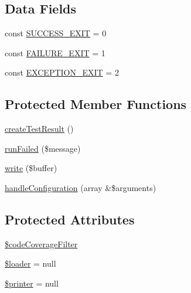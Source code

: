 \subsection*{Data Fields}
\begin{DoxyCompactItemize}
\item 
const \mbox{\hyperlink{class_p_h_p_unit___text_u_i___test_runner_a0be479aca54ac1c979f4d6ca78a8f354}{S\+U\+C\+C\+E\+S\+S\+\_\+\+E\+X\+IT}} = 0
\item 
const \mbox{\hyperlink{class_p_h_p_unit___text_u_i___test_runner_a3fd31acacaf8046bb92d7726869d0489}{F\+A\+I\+L\+U\+R\+E\+\_\+\+E\+X\+IT}} = 1
\item 
const \mbox{\hyperlink{class_p_h_p_unit___text_u_i___test_runner_a3441c77fb1d5dc5831a2277b5aa7d2b2}{E\+X\+C\+E\+P\+T\+I\+O\+N\+\_\+\+E\+X\+IT}} = 2
\end{DoxyCompactItemize}
\subsection*{Protected Member Functions}
\begin{DoxyCompactItemize}
\item 
\mbox{\hyperlink{class_p_h_p_unit___text_u_i___test_runner_a55202b5955819fc3c464a5801d1f7405}{create\+Test\+Result}} ()
\item 
\mbox{\hyperlink{class_p_h_p_unit___text_u_i___test_runner_a51ed3bece021dbcaad0aa7a8c911de39}{run\+Failed}} (\$message)
\item 
\mbox{\hyperlink{class_p_h_p_unit___text_u_i___test_runner_ab3c1b3a323cbbf707c55cc3cd3efd811}{write}} (\$buffer)
\item 
\mbox{\hyperlink{class_p_h_p_unit___text_u_i___test_runner_a24a536cc54679b5d1948054ad3c70fa7}{handle\+Configuration}} (array \&\$arguments)
\end{DoxyCompactItemize}
\subsection*{Protected Attributes}
\begin{DoxyCompactItemize}
\item 
\mbox{\hyperlink{class_p_h_p_unit___text_u_i___test_runner_aa638767a19d3846eb30612a040cb4081}{\$code\+Coverage\+Filter}}
\item 
\mbox{\hyperlink{class_p_h_p_unit___text_u_i___test_runner_ab832f4c463ee1c9ba2e9464265f7ea3b}{\$loader}} = null
\item 
\mbox{\hyperlink{class_p_h_p_unit___text_u_i___test_runner_a8f1a1a1e302df6070d50a8b8f6d7a0f0}{\$printer}} = null
\end{DoxyCompactItemize}

